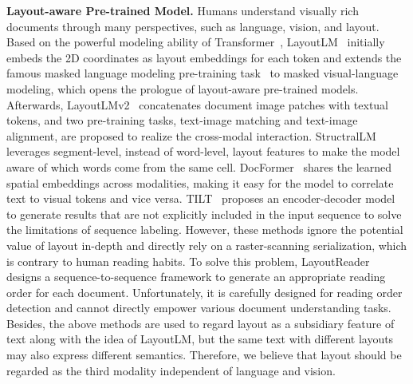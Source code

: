 \documentclass[11pt]{article}
\begin{document}
\noindent\textbf{Layout-aware Pre-trained Model.}
Humans understand visually rich documents through many perspectives, such as language, vision, and layout.
Based on the powerful modeling ability of Transformer~\cite{vaswani2017attention}, 
LayoutLM~\cite{xu2020layoutlm} initially embeds the 2D coordinates as layout embeddings for each token and extends the famous masked language modeling pre-training task~\cite{devlin2019bert} to masked visual-language modeling, which opens the prologue of layout-aware pre-trained models.
Afterwards, LayoutLMv2~\cite{xu2021layoutlmv2} concatenates document image patches with textual tokens, and two pre-training tasks, text-image matching and text-image alignment, are proposed to realize the cross-modal interaction.
StructralLM~\cite{li2021structurallm} leverages segment-level, instead of word-level, layout features to make the model aware of which words come from the same cell.
DocFormer~\cite{appalaraju2021docformer} shares the learned spatial embeddings across modalities, making it easy for the model to correlate text to visual tokens and vice versa.
TILT~\cite{powalski2021going} proposes an encoder-decoder model to generate results that are not explicitly included in the input sequence to solve the limitations of sequence labeling.
However, these methods ignore the potential value of layout in-depth and directly rely on a raster-scanning serialization, which is contrary to human reading habits.
To solve this problem, LayoutReader~\cite{wang2021layoutreader} designs a sequence-to-sequence framework to generate an appropriate reading order for each document. Unfortunately, it is carefully designed for reading order detection and cannot directly empower various document understanding tasks.
Besides, the above methods are used to regard layout as a subsidiary feature of text along with the idea of LayoutLM, but the same text with different layouts may also express different semantics. Therefore, we believe that layout should be regarded as the third modality independent of language and vision.
\end{document}
